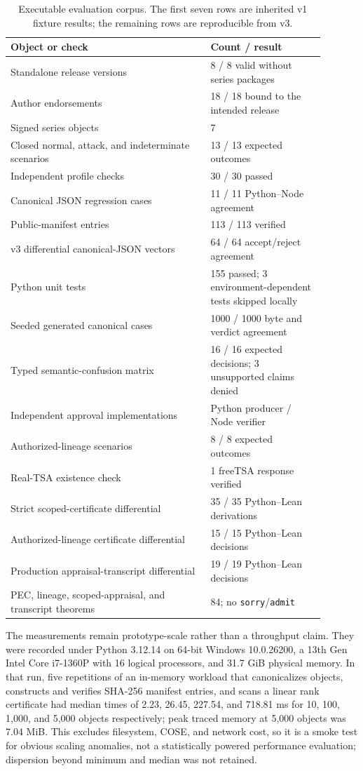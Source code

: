 \documentclass[11pt]{article}
\begin{document}
\begin{table}[t]
\centering
\caption{Executable evaluation corpus. The first seven rows are inherited v1 fixture results; the remaining rows are reproducible from v3.}
\begin{tabular}{p{0.57\linewidth}p{0.32\linewidth}}
\toprule
Object or check & Count / result \\
\midrule
Standalone release versions & 8 / 8 valid without series packages \\
Author endorsements & 18 / 18 bound to the intended release \\
Signed series objects & 7 \\
Closed normal, attack, and indeterminate scenarios & 13 / 13 expected outcomes \\
Independent profile checks & 30 / 30 passed \\
Canonical JSON regression cases & 11 / 11 Python--Node agreement \\
Public-manifest entries & 113 / 113 verified \\
v3 differential canonical-JSON vectors & 64 / 64 accept/reject agreement \\
Python unit tests & 155 passed; 3 environment-dependent tests skipped locally \\
Seeded generated canonical cases & 1000 / 1000 byte and verdict agreement \\
Typed semantic-confusion matrix & 16 / 16 expected decisions; 3 unsupported claims denied \\
Independent approval implementations & Python producer / Node verifier \\
Authorized-lineage scenarios & 8 / 8 expected outcomes \\
Real-TSA existence check & 1 freeTSA response verified \\
Strict scoped-certificate differential & 35 / 35 Python--Lean derivations \\
Authorized-lineage certificate differential & 15 / 15 Python--Lean decisions \\
Production appraisal-transcript differential & 19 / 19 Python--Lean decisions \\
PEC, lineage, scoped-appraisal, and transcript theorems & 84; no \texttt{sorry}/\texttt{admit} \\
\bottomrule
\end{tabular}
\end{table}

The measurements remain prototype-scale rather than a throughput claim. They
were recorded under Python 3.12.14 on 64-bit Windows 10.0.26200, a 13th Gen
Intel Core i7-1360P with 16 logical processors, and 31.7 GiB physical memory.
In that run, five repetitions of an in-memory workload that canonicalizes
objects, constructs and verifies SHA-256 manifest entries, and scans a linear
rank certificate had median times of 2.23, 26.45, 227.54, and 718.81 ms for
10, 100, 1,000, and 5,000 objects respectively; peak traced memory at 5,000
objects was 7.04 MiB. This excludes filesystem, COSE, and network cost, so it
is a smoke test for obvious scaling anomalies, not a statistically powered
performance evaluation; dispersion beyond minimum and median was not retained.
\end{document}
